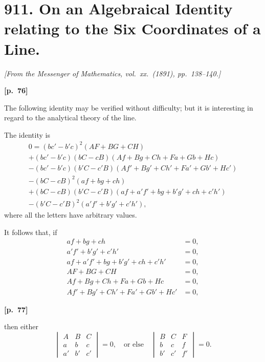 \documentclass[11pt,a4paper]{article}
\theoremstyle{plain}
\begin{document}
\section*{911. On an Algebraical Identity relating to the Six Coordinates of a Line.}

\noindent\textit{[From the Messenger of Mathematics, vol.\ xx.\ (1891), pp.\ 138--140.]}

\vspace{0.5em}
\noindent\textbf{[p.\ 76]}

The following identity may be verified without difficulty; but it is interesting in regard to the analytical theory of the line.

The identity is
\begin{multline*}
0 = (bc' - b'c)^2(AF + BG + CH) \\
+ (bc' - b'c)(bC - cB)(Af + Bg + Ch + Fa + Gb + Hc) \\
- (bc' - b'c)(b'C - c'B)(Af' + Bg' + Ch' + Fa' + Gb' + Hc') \\
- (bC - cB)^2(af + bg + ch) \\
+ (bC - cB)(b'C - c'B)(af + a'f' + bg + b'g' + ch + c'h') \\
- (b'C - c'B)^2(a'f' + b'g' + c'h'),
\end{multline*}
where all the letters have arbitrary values.

It follows that, if
\begin{align*}
af + bg + ch &= 0, \\
a'f' + b'g' + c'h' &= 0, \\
af + a'f' + bg + b'g' + ch + c'h' &= 0, \\
AF + BG + CH &= 0, \\
Af + Bg + Ch + Fa + Gb + Hc &= 0, \\
Af' + Bg' + Ch' + Fa' + Gb' + Hc' &= 0,
\end{align*}

\vspace{0.5em}
\noindent\textbf{[p.\ 77]}

then either
$$
\begin{vmatrix} A & B & C \\ a & b & c \\ a' & b' & c' \end{vmatrix} = 0,
\quad \text{or else} \quad
\begin{vmatrix} B & C & F \\ b & c & f \\ b' & c' & f' \end{vmatrix} = 0.
$$
\end{document}

